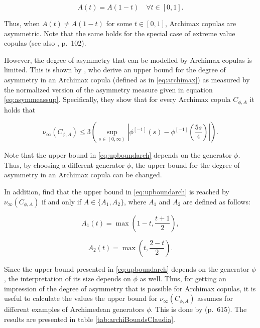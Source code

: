 \documentclass[
]{krantz}
\begin{document}
\begin{equation}
A(t) = A(1-t) \quad \forall t \in [0,1].
\label{eq:archasymcond}
\end{equation}

Thus, when \(A(t) \neq A(1-t)\) for some \(t \in [0,1]\), Archimax copulas are asymmetric. Note that the same holds for the special case of extreme value copulas (see also \citet{genest2013}, p.~102).

However, the degree of asymmetry that can be modelled by Archimax copulas is limited. This is shown by \citet{durante2010b}, who derive an upper bound for the degree of asymmetry in an Archimax copula (defined as in \eqref{eq:archimax}) as measured by the normalized version of the asymmetry measure given in equation \eqref{eq:asymmeassup}. Specifically, they show that for every Archimax copula \(C_{\phi, A}\) it holds that

\begin{equation}
\nu_{\infty}(C_{\phi, A}) \leq 3\left( \sup_{s \in (0,\infty)} \left| \phi^{[-1]}(s) - \phi^{[-1]}\left(\frac{5s}{4}\right) \right| \right).
\label{eq:upboundarch}
\end{equation}

Note that the upper bound in \eqref{eq:upboundarch} depends on the generator \(\phi\). Thus, by choosing a different generator \(\phi\), the upper bound for the degree of asymmetry in an Archimax copula can be changed.

In addition, \citet{durante2010b} find that the upper bound in \eqref{eq:upboundarch} is reached by \(\nu_{\infty}(C_{\phi, A})\) if and only if \(A \in \{A_1, A_2\}\), where \(A_1\) and \(A_2\) are defined as follows:

\begin{equation}
A_1(t) = \max\left(1 - t, \frac{t + 1}{2}\right),
\label{eq:a1}
\end{equation}

\begin{equation}
A_2(t) = \max\left(t, \frac{2 - t}{2}\right).
\label{eq:a2}
\end{equation}

Since the upper bound presented in \eqref{eq:upboundarch} depends on the generator \(\phi\), the interpretation of its size depends on \(\phi\) as well. Thus, for getting an impression of the degree of asymmetry that is possible for Archimax copulas, it is useful to calculate the values the upper bound for \(\nu_\infty(C_{\phi, A})\) assumes for different examples of Archimedean generators \(\phi\). This is done by \citet{durante2010b} (p.~615). The results are presented in table \ref{tab:archiBoundsClaudia}.
\end{document}
